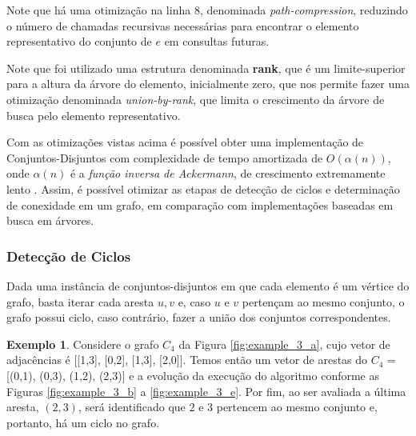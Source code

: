 \documentclass[article,a4paper,12pt,brazil,sumario=tradicional]{abntex2}
\theoremstyle{definition} %
\newtheorem{example}{Exemplo}
\begin{document}


Note que há uma otimização na linha 8, denominada \textit{path-compression}, reduzindo o número de chamadas recursivas necessárias para encontrar o elemento representativo do conjunto de $e$ em consultas futuras.



Note que foi utilizado uma estrutura denominada \textbf{rank}, que é um limite-superior para a altura da árvore do elemento, inicialmente zero, que nos permite fazer uma otimização denominada \textit{union-by-rank}, que limita o crescimento da árvore de busca pelo elemento representativo.

Com as otimizações vistas acima é possível obter uma implementação de Conjuntos-Disjuntos com complexidade de tempo amortizada de $O(\alpha(n))$, onde $\alpha(n)$ é a \textit{função inversa de Ackermann}\cite{Ackermann1928}, de crescimento extremamente lento \cite{fredman_saks}. Assim, é possível otimizar as etapas de detecção de ciclos e determinação de conexidade em um grafo, em comparação com implementações baseadas em busca em árvores.


\subsubsection{Detecção de Ciclos}

Dada uma instância de conjuntos-disjuntos em que cada elemento é um vértice do grafo, basta iterar cada aresta $u, v$ e, caso $u$ e $v$ pertençam ao mesmo conjunto, o grafo possui ciclo, caso contrário, fazer a união dos conjuntos correspondentes.





\begin{example}    

Considere o grafo $C_4$ da Figura \ref{fig:example_3_a}, cujo vetor de adjacências é [[1,3], [0,2], [1,3], [2,0]]. Temos então um vetor de arestas do $C_4$ = [(0,1), (0,3), (1,2), (2,3)] e a evolução da execução do algoritmo conforme as Figuras \ref{fig:example_3_b} a \ref{fig:example_3_e}. Por fim, ao ser avaliada a última aresta, $(2,3)$, será identificado que $2$ e $3$ pertencem ao mesmo conjunto e, portanto, há um ciclo no grafo.

\end{example}
\end{document}
